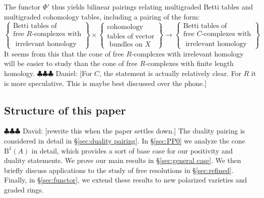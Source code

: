 \documentclass[12pt]{amsart}
\theoremstyle{definition}
\theoremstyle{remark}
\newcommand{\BBQ}{\mathrm{B}}
\newcommand{\daniel}[1]{{\color{green} \sf $\clubsuit\clubsuit\clubsuit$ Daniel: [#1]}}
\newcommand{\david}[1]{{\color{red} \sf $\clubsuit\clubsuit\clubsuit$ David: [#1]}}
\begin{document}
The functor $\Phi'$ thus yields bilinear pairings relating multigraded Betti tables and multigraded cohomology tables, including a pairing of the form:
\begin{equation*}%
\label{eqn:multipairing}
%
\left\{\begin{matrix}
\text{Betti tables of} \\ \text{free $R$-complexes with}\\
\text{  irrelevant homology}\end{matrix}\right\}
%
\times 
%
\left\{\begin{matrix}
\text{cohomology }\\
\text{tables of vector}\\
\text{ bundles on } X
\end{matrix}\right\}
%
\longrightarrow
\left\{\begin{matrix}
\text{Betti tables of} \\ \text{free $C$-complexes with}\\
\text{  irrelevant homology}
\end{matrix}\right\}
\end{equation*}
It seems from this that the cone of free $R$-complexes with irrelevant homology will be easier to study than the cone of free $R$-complexes with finite length homology.  \daniel{For $C$, the statement is actually relatively clear.  For $R$ it is more speculative.  This is maybe best discussed over the phone.}

\subsection*{Structure of this paper}
\david{rewrite this when the paper settles down.} 
 The duality pairing is considered in detail in \S\ref{sec:duality pairing}. In \S\ref{sec:PP0} we analyze the cone $\BBQ^1(A)$ in detail, which provides a sort of base case for our positivity and duality statements.  We prove our main results in \S\ref{sec:general case}.  We then briefly discuss applications to the study of free resolutions in \S\ref{sec:refined}.  Finally, in \S\ref{sec:functor}, we extend these results to new polarized varieties and graded rings.

\end{document}
